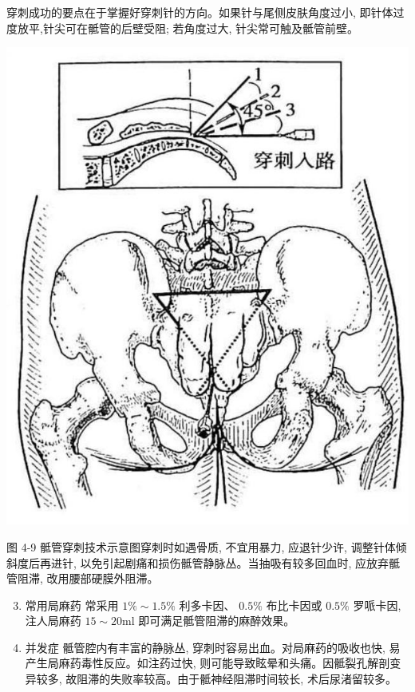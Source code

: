 \documentclass[10pt]{article}
\begin{document}
穿刺成功的要点在于掌握好穿刺针的方向。如果针与尾侧皮肤角度过小, 即针体过度放平,针尖可在骶管的后壁受阻; 若角度过大, 针尖常可触及骶管前壁。

\begin{center}
\includegraphics[max width=\textwidth]{2024_07_09_002a177993bd97d1d6d7g-069}
\end{center}

图 4-9 骶管穿刺技术示意图穿刺时如遇骨质, 不宜用暴力, 应退针少许, 调整针体倾斜度后再进针, 以免引起剧痛和损伤骶管静脉丛。当抽吸有较多回血时, 应放弃骶管阻滞, 改用腰部硬膜外阻滞。

\begin{enumerate}
  \setcounter{enumi}{2}
  \item 常用局麻药 常采用 $1 \% \sim 1.5 \%$ 利多卡因、 $0.5 \%$ 布比卡因或 $0.5 \%$ 罗哌卡因, 注人局麻药 $15 \sim 20 \mathrm{ml}$ 即可满足骶管阻滞的麻醉效果。

  \item 并发症 骶管腔内有丰富的静脉丛, 穿刺时容易出血。对局麻药的吸收也快, 易产生局麻药毒性反应。如注药过快, 则可能导致眩晕和头痛。因骶裂孔解剖变异较多, 故阻滞的失败率较高。由于骶神经阻滞时间较长, 术后尿渚留较多。

\end{enumerate}
\end{document}
